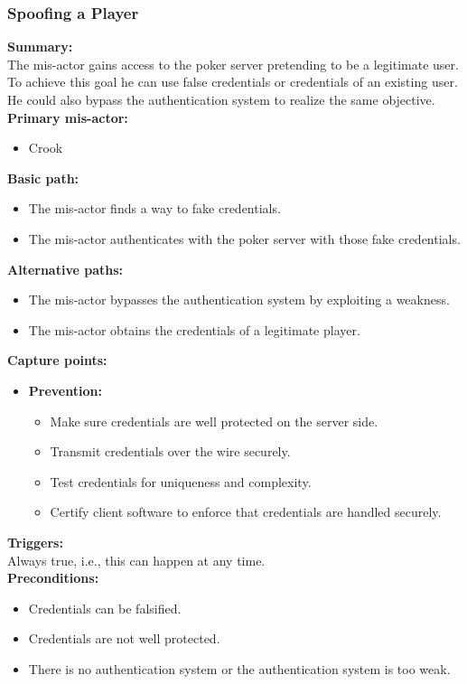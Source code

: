 \documentclass[a4paper,11pt]{report}
\begin{document}
\subsubsection{Spoofing a Player}
\label{PlayerCasesS}
\textbf{Summary:} \\
The mis-actor gains access to the poker server pretending to be a legitimate user. To achieve this goal he can use false credentials or credentials of an existing user. He could also bypass the authentication system to realize the same objective. \\
\textbf{Primary mis-actor:}
\begin{itemize}
\item Crook
\end{itemize}
\textbf{Basic path:}
\begin{itemize}
\item The mis-actor finds a way to fake credentials.
\item The mis-actor authenticates with the poker server with those fake credentials.
\end{itemize}
\textbf{Alternative paths:}
\begin{itemize}
\item The mis-actor bypasses the authentication system by exploiting a weakness.
\item The mis-actor obtains the credentials of a legitimate player.
\end{itemize}
\textbf{Capture points:}
\begin{itemize}
\item \textbf{Prevention:}
\begin{itemize}

\item Make sure credentials are well protected on the server side.
\item Transmit credentials over the wire securely.
\item Test credentials for uniqueness and complexity.
\item Certify client software to enforce that credentials are handled securely.
\end{itemize}
\end{itemize}
\textbf{Triggers:}\\
Always true, i.e., this can happen at any time. \\
\textbf{Preconditions:}
\begin{itemize}
\item Credentials can be falsified.
\item Credentials are not well protected.
\item There is no authentication system or the authentication system is too weak.
\end{itemize}
\end{document}
